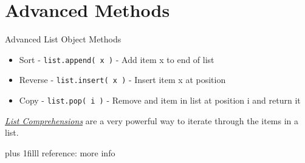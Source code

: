 \documentclass[fleqn]{beamer} %
\newcommand{\sectiontitleIV}{Advanced Methods}
\newcommand{\btVFill}{\vskip0pt plus 1filll}
\begin{document}
\section{\sectiontitleIV}	
	\begin{frame}[label=sectionIV] \small
		 
		\vspace*{3mm} 	

		Advanced List Object Methods
		\begin{itemize}

		\item Sort -  \lstinline{list.append( x )} - Add item x to end of list \\ 
		\item Reverse -   \lstinline{list.insert( x )} - Insert item x at position \\ 
		\item Copy -  \lstinline{list.pop( i )} - Remove and item in list at position i and return it \\ 
		
		\end{itemize}

		\vspace*{10mm}

		\href{https://docs.python.org/3/tutorial/datastructures.html\#list-comprehensions}{\it List Comprehensions} are a very powerful way to iterate through the items in a list.

		\btVFill
		\tiny{reference: more info } 
	\end{frame}

\end{document}
